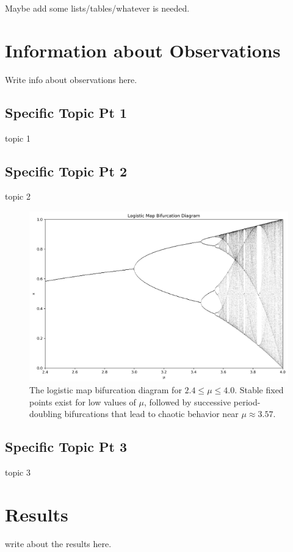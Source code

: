 \documentclass{aastex631}
\begin{document}
Maybe add some lists/tables/whatever is needed.



\section{Information about Observations}
Write info about observations here.

\subsection{Specific Topic Pt 1} \label{sec:subtopic1}
topic 1

\subsection{Specific Topic Pt 2} \label{sec:subtopic2}
topic 2

\begin{figure}[H]
    \centering
    \includegraphics[width=0.9\linewidth]{bifurcation.png}
    \caption{The logistic map bifurcation diagram for $2.4\leq \mu \leq 4.0$. Stable fixed points exist for low values of $\mu$, followed by successive period-doubling bifurcations that lead to chaotic behavior near $\mu\approx 3.57$.}
    \label{fig:bifurcation}
\end{figure}


\subsection{Specific Topic Pt 3} \label{sec:subtopic3}
topic 3

\section{Results} \label{sec:results}
write about the results here.
\end{document}
